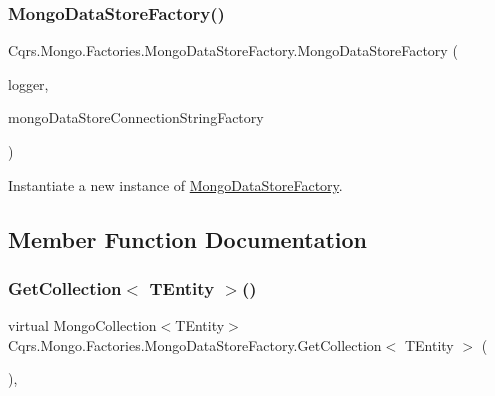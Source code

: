 \subsubsection{\texorpdfstring{Mongo\+Data\+Store\+Factory()}{MongoDataStoreFactory()}}
{\footnotesize\ttfamily Cqrs.\+Mongo.\+Factories.\+Mongo\+Data\+Store\+Factory.\+Mongo\+Data\+Store\+Factory (\begin{DoxyParamCaption}\item[{I\+Logger}]{logger,  }\item[{\hyperlink{interfaceCqrs_1_1Mongo_1_1Factories_1_1IMongoDataStoreConnectionStringFactory}{I\+Mongo\+Data\+Store\+Connection\+String\+Factory}}]{mongo\+Data\+Store\+Connection\+String\+Factory }\end{DoxyParamCaption})}



Instantiate a new instance of \hyperlink{classCqrs_1_1Mongo_1_1Factories_1_1MongoDataStoreFactory}{Mongo\+Data\+Store\+Factory}. 



\subsection{Member Function Documentation}
\mbox{\label{classCqrs_1_1Mongo_1_1Factories_1_1MongoDataStoreFactory_a4785651135b3a214a855b4d1f7700836_a4785651135b3a214a855b4d1f7700836}} 
\subsubsection{\texorpdfstring{Get\+Collection$<$ T\+Entity $>$()}{GetCollection< TEntity >()}}
{\footnotesize\ttfamily virtual Mongo\+Collection$<$T\+Entity$>$ Cqrs.\+Mongo.\+Factories.\+Mongo\+Data\+Store\+Factory.\+Get\+Collection$<$ T\+Entity $>$ (\begin{DoxyParamCaption}{ }\end{DoxyParamCaption})\hspace{0.3cm}{\ttfamily [protected]}, {\ttfamily [virtual]}}



